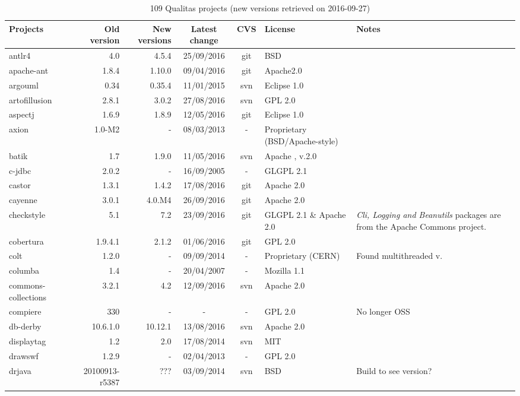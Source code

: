 \documentclass{sig-alternate-05-2015}
\begin{document}
\begin{table}
	\centering
	\caption{109 Qualitas projects (new versions retrieved on 2016-09-27)}
	\label{t:new_and_old}
	\small
		\begin{tabular}{l|r|r|c|c|p{3cm}|p{3cm}}
			\hline 
			Projects & Old version & New versions & Latest change & CVS & License & Notes \\
			\hline
			antlr4 & 4.0 & 4.5.4 & 25/09/2016 & git & BSD & \\
			apache-ant & 1.8.4 & 1.10.0 & 09/04/2016 & git & Apache2.0 & \\
			argouml & 0.34 & 0.35.4 & 11/01/2015 	& svn & Eclipse  1.0 & \\
			artofillusion & 2.8.1 & 3.0.2 & 27/08/2016 & svn & GPL 2.0 & \\
			aspectj & 1.6.9 & 1.8.9 & 12/05/2016 & git & Eclipse   1.0 & \\
			axion & 1.0-M2 & - & 08/03/2013 & - & Proprietary (BSD/Apache-style) & \\
			batik & 1.7 & 1.9.0 & 11/05/2016 & svn & Apache , v.2.0 & \\
			c-jdbc & 2.0.2 & - & 16/09/2005 & - & GLGPL 2.1 & \\
			castor & 1.3.1 & 1.4.2 & 17/08/2016 & git & Apache 2.0 & \\
			cayenne & 3.0.1 & 4.0.M4 &  26/09/2016 & git & Apache 2.0 & \\
			checkstyle & 5.1 & 7.2  & 23/09/2016 & git & GLGPL 2.1 \& Apache 2.0 & \textit{Cli, Logging and Beanutils} packages are from the Apache Commons project. \\
			cobertura & 1.9.4.1 & 2.1.2 & 01/06/2016 & git & GPL 2.0  & \\
			colt & 1.2.0 & - & 09/09/2014 & - & Proprietary (CERN) & Found multithreaded v. \\
			columba & 1.4 & - & 20/04/2007 & - & Mozilla   1.1  & \\
			commons-collections & 3.2.1 & 4.2 & 12/09/2016 & svn & Apache 2.0 & \\
			compiere & 330 & - & - & - & GPL 2.0 & No longer OSS \\
			db-derby & 10.6.1.0 & 10.12.1 & 13/08/2016 & svn & Apache 2.0 & \\
			displaytag & 1.2 & 2.0 & 17/08/2014 & svn & MIT  & \\
			drawswf & 1.2.9 & - & 02/04/2013 & - & GPL 2.0 & \\
			drjava & 20100913-r5387 & ??? & 03/09/2014 & svn & BSD  & Build to see version? \\

\end{tabular}
\end{table}
\end{document}
